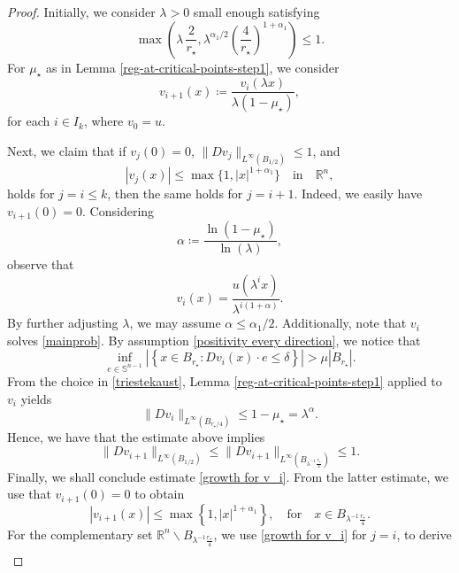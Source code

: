 \documentclass[reqno,11pt]{amsart}
\numberwithin{equation}{section}
\numberwithin{equation}{section}
\begin{document}
\begin{proof}
Initially, we consider $\lambda>0$ small enough satisfying
\begin{equation}\label{smallness regime of lambda in reg at criti points}
    \max\left(\lambda\, \frac{2}{r_\star}, \lambda^{\alpha_1/2}\left(\frac{4}{r_\star}\right)^{1+\alpha_1}\right) \leq 1.
\end{equation}
For $\mu_\star$ as in Lemma \ref{reg-at-critical-points-step1}, we consider 
$$
    v_{i+1}(x) \coloneqq \frac{v_i(\lambda x)}{\lambda (1-\mu_\star)},
$$
for each $i \in I_k$, where $v_0 = u$.  

Next, we claim that if $v_j(0) = 0$, $\|Dv_j\|_{L^\infty(B_{1/2})} \leq 1$, and 
\begin{equation}\label{growth for v_i}
|v_j(x)|\leq \max\{1,|x|^{1+\alpha_1}\} \quad \mbox{in} \quad \mathbb{R}^n, 
\end{equation}
holds for $j=i \leq k$, then the same holds for $j=i+1$. Indeed, we easily have $v_{i+1}(0) = 0$. Considering 
\begin{equation}\label{triestekaust}
\alpha \coloneqq \frac{\ln(1-\mu_\star)}{\ln(\lambda)},
\end{equation}
observe that 
$$
    v_i(x) = \frac{u(\lambda^i x)}{\lambda^{i(1+\alpha)}}.
$$
By further adjusting $\lambda$, we may assume $\alpha \leq \alpha_1/2$. Additionally, note that $v_i$ solves \eqref{mainprob}. By assumption \eqref{positivity every direction}, we notice that
$$
    \inf_{e \in \mathbb{S}^{n-1}}\left|\left\{x \in B_{r_\star}\colon Dv_i(x) \cdot e \leq \delta  \right\} \right| > \mu |B_{r_\star}|.
$$
From the choice in \eqref{triestekaust}, Lemma \ref{reg-at-critical-points-step1} applied to $v_i$ yields
\begin{equation}\label{osc_improv_for_v_i}
\|Dv_i\|_{L^\infty\left(B_{r_\star/4} \right)} \leq 1-\mu_\star = \lambda^\alpha. 
\end{equation}
Hence, we have that the estimate above implies
$$
\|Dv_{i+1}\|_{L^\infty\left(B_{1/2}\right)} \leq \|Dv_{i+1}\|_{L^\infty\left(B_{\lambda^{-1}\frac{r_\star }{4}}\right)} \leq 1.
$$
Finally, we shall conclude estimate \eqref{growth for v_i}. From the latter estimate, we use that $v_{i+1}(0)=0$ to obtain 
$$
    |v_{i+1}(x)| \leq \max\left\{1,|x|^{1+\alpha_1} \right\}, \quad \mbox{for} \quad x \in B_{\lambda^{-1}\frac{r_\star }{4}}.
$$
For the complementary set $\mathbb{R}^n \backslash B_{\lambda^{-1}\frac{r_\star }{4}}$, we use \eqref{growth for v_i} for $j=i$, to derive
\begin{eqnarray*}

\end{eqnarray*}
\end{proof}
\end{document}
